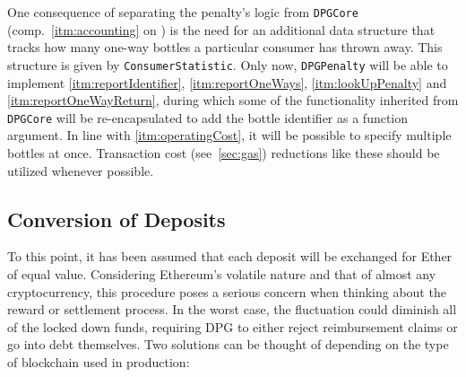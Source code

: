 \begin{description}[format={\storedescriptionlabel}]
	One consequence of separating the penalty's logic from \texttt{DPGCore} (comp.~\ref{itm:accounting} on ) is the need for an additional data structure that tracks how many one-way bottles a particular consumer has thrown away. This structure is given by \texttt{ConsumerStatistic}. Only now, \texttt{DPGPenalty} will be able to implement \ref{itm:reportIdentifier}, \ref{itm:reportOneWays}, \ref{itm:lookUpPenalty} and \ref{itm:reportOneWayReturn}, during which some of the functionality inherited from \texttt{DPGCore} will be re-encapsulated to add the bottle identifier as a function argument. In line with \ref{itm:operatingCost}, it will be possible to specify multiple bottles at once. Transaction cost (see~\ref{sec:gas}) reductions like these should be utilized whenever possible.
\end{description}



\subsection{Conversion of Deposits}
\label{sec:depositConversion}
To this point, it has been assumed that each deposit will be exchanged for Ether of equal value. Considering Ethereum's volatile nature and that of almost any cryptocurrency, this procedure poses a serious concern when thinking about the reward or settlement process. In the worst case, the fluctuation could diminish all of the locked down funds, requiring \ac{DPG} to either reject reimbursement claims or go into debt themselves. Two solutions can be thought of depending on the type of blockchain used in production:

